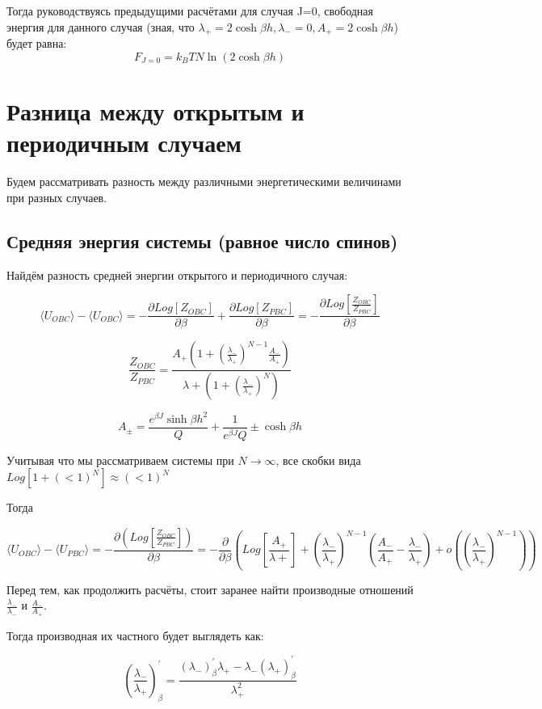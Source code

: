 \documentclass{article}
\newcommand{\bj}{\beta J}
\newcommand{\bh}{\beta h}
\newcommand{\lp}{\lambda_{+}}
\newcommand{\lm}{\lambda_{-}}
\newcommand{\ap}{A_{+}}
\newcommand{\am}{A_{-}}
\newcommand{\apm}{A_{\pm}}
\newcommand{\pbc}{_{PBC}}
\newcommand{\obc}{_{OBC}}
\newcommand{\prpb}{^{'}_{\beta}}
\newcommand{\la}{\langle}
\newcommand{\ra}{\rangle}
\numberwithin{equation}{section}
\begin{document}
Тогда руководствуясь предыдущими расчётами для случая J=0, свободная энергия для данного случая (зная, что $\lp = 2\cosh{\bh}, \lm = 0, A_{+} = 2\cosh{\bh}$) будет равна:
\[ F_{J=0} = k_{B}T N \ln{(2\cosh{\bh})}\]
\section{Разница между открытым и периодичным случаем}

Будем рассматривать разность между различными энергетическими величинами при разных случаев.

\subsection{Средняя энергия системы (равное число спинов)}


Найдём разность средней энергии открытого и периодичного случая:

\begin{equation}
    \la U\obc \ra - \la U\obc \ra = -\frac{\partial Log[Z\obc]}{\partial \beta} + \frac{\partial Log[Z\pbc]}{\partial \beta} = -\frac{\partial Log[\frac{Z\obc}{Z\pbc}]}{\partial \beta}
\end{equation}

\[ \frac{Z\obc}{Z\pbc} = \frac{A_{+}\left( 1 + (\frac{\lambda_{-}}{\lambda_{+}})^{N - 1}  \frac{A_{-}}{A_{+}}\right)}{\lambda{+}(1 + (\frac{\lambda_{-}}{\lambda_{+}})^{N})} \]

\[ \apm = \frac{e^{\bj} \sinh{\bh}^2}{Q} + \frac{1}{e^{\bj}Q} \pm \cosh{\bh} \]

Учитывая что мы рассматриваем системы при $N \rightarrow \infty$,
все скобки вида $ Log[ 1 + (<1)^{N} ] \approx (<1)^{N} $ 

Тогда

\begin{equation}\label{LogPrPB}
     \la U\obc \ra - \la U\pbc \ra =  -\frac{\partial ( Log[\frac{Z\obc}{Z\pbc}])}{\partial \beta} = -\frac{\partial}{\partial \beta} \left(Log[\frac{A_{+}}{\lambda{+}}] + (\frac{\lambda_{-}}{\lambda_{+}})^{N - 1}(\frac{A_{-}}{A_{+}} - \frac{\lm}{\lp}) + o((\frac{\lambda_{-}}{\lambda_{+}})^{N-1})\right)
\end{equation}

Перед тем, как продолжить расчёты, стоит заранее найти производные отношений $\frac{\lm}{\lm}$ и $\frac{\am}{\ap}$. 

Тогда производная их частного будет выглядеть как:

\[ (\frac{\lm}{\lp})\prpb = \frac{(\lm)\prpb\lp-\lm(\lp)\prpb}{\lp^{2}}\]
\end{document}
